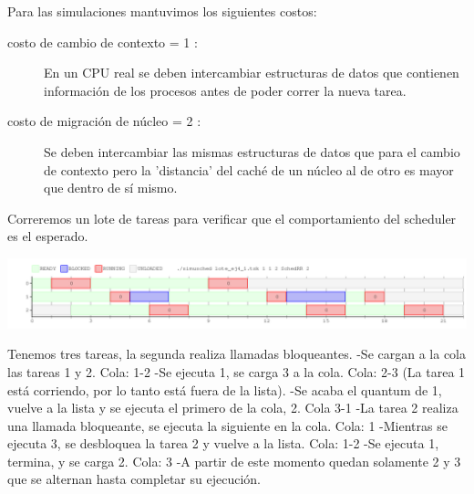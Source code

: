 Para las simulaciones mantuvimos los siguientes costos:
\begin{description}
 \item[costo de cambio de contexto = 1 :]{En un CPU real se deben intercambiar estructuras de datos que contienen información de los procesos antes de poder correr la nueva tarea.}
 \item[costo de migración de núcleo = 2 :]{Se deben intercambiar las mismas estructuras de datos que para el cambio de contexto pero la 'distancia' del caché de un núcleo al de otro es mayor que dentro de sí mismo.}
\end{description}

Correremos un lote de tareas para verificar que el comportamiento del scheduler es el esperado.

\begin{center}
 \includegraphics{./RR/RR_simple.png}
\end{center}

Tenemos tres tareas, la segunda realiza llamadas bloqueantes.
-Se cargan a la cola las tareas 1 y 2. Cola: 1-2
-Se ejecuta 1, se carga 3 a la cola. Cola: 2-3 (La tarea 1 está corriendo, por lo tanto está fuera de la lista).
-Se acaba el quantum de 1, vuelve a la lista y se ejecuta el primero de la cola, 2. Cola 3-1
-La tarea 2 realiza una llamada bloqueante, se ejecuta la siguiente en la cola. Cola: 1
-Mientras se ejecuta 3, se desbloquea la tarea 2 y vuelve a la lista. Cola: 1-2
-Se ejecuta 1, termina, y se carga 2. Cola: 3
-A partir de este momento quedan solamente 2 y 3 que se alternan hasta completar su ejecución.


